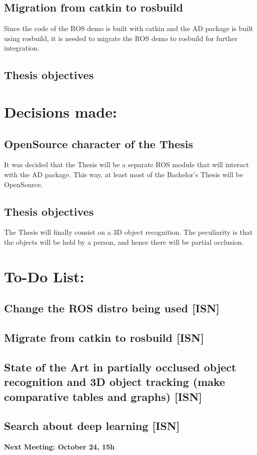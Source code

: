 \documentclass{article}
\newenvironment{myindentpar}[1]%
 {\begin{list}{}%
         {\setlength{\leftmargin}{#1}}%
         \item[]%
 }
 {\end{list}}
\begin{document}
	\subsection{Migration from catkin to rosbuild}
		\begin{myindentpar}{1cm} 
 		Since the code of the ROS demo is built with catkin and the AD package is built using rosbuild, it is needed to migrate the ROS demo to rosbuild for further integration. 
		\end{myindentpar}

	\subsection{Thesis objectives}
		


\section{\LARGE Decisions made:}

	\subsection{OpenSource character of the Thesis}
		\begin{myindentpar}{1cm} 
		It was decided that the Thesis will be a separate ROS module that will interact with the AD package. This way, at least most of the Bachelor's Thesis will be OpenSource. 
	
		\end{myindentpar}
	\subsection{Thesis objectives}
		\begin{myindentpar}{1cm} 
 		The Thesis will finally consist on a 3D object recognition. The peculiarity is that the objects will be held by a person, and hence there will be partial occlusion. 
		\end{myindentpar}

\section{\LARGE To-Do List: }
	\subsection{Change the ROS distro being used [ISN]}
	\subsection{Migrate from catkin to rosbuild [ISN]}
	\subsection{State of the Art in partially occlused object recognition and 3D object tracking  (make comparative tables and graphs) [ISN]}
		
	\subsection{Search about deep learning [ISN]}


\begin {center}
{\Large \textbf{Next Meeting: October 24, 15h }}
\end{center}
\end{document}
